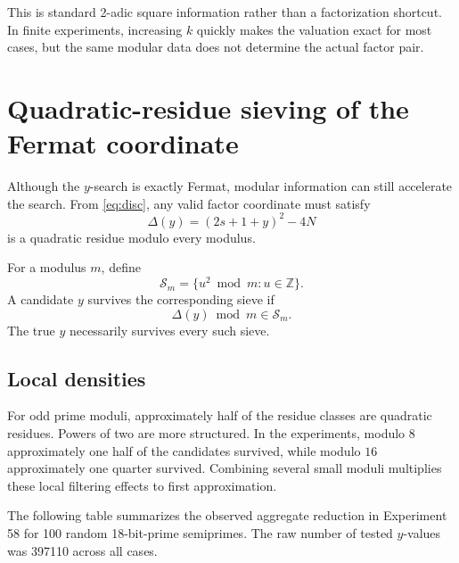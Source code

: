 \documentclass[11pt,a4paper]{article}
\newcommand{\Z}{\mathbb{Z}}
\begin{document}
This is standard 2-adic square information rather than a factorization shortcut. In finite experiments, increasing \(k\) quickly makes the valuation exact for most cases, but the same modular data does not determine the actual factor pair.

\section{Quadratic-residue sieving of the Fermat coordinate}
\label{sec:sieve}

Although the \(y\)-search is exactly Fermat, modular information can still accelerate the search. From \eqref{eq:disc}, any valid factor coordinate must satisfy
\begin{equation}
\Delta(y)=(2s+1+y)^2-4N
\end{equation}
is a quadratic residue modulo every modulus.

For a modulus \(m\), define
\begin{equation}
\mathcal S_m=\{u^2\bmod m:u\in\Z\}.
\end{equation}
A candidate \(y\) survives the corresponding sieve if
\begin{equation}
\Delta(y)\bmod m\in\mathcal S_m.
\end{equation}
The true \(y\) necessarily survives every such sieve.

\subsection{Local densities}

For odd prime moduli, approximately half of the residue classes are quadratic residues. Powers of two are more structured. In the experiments, modulo \(8\) approximately one half of the candidates survived, while modulo \(16\) approximately one quarter survived. Combining several small moduli multiplies these local filtering effects to first approximation.

The following table summarizes the observed aggregate reduction in Experiment 58 for 100 random 18-bit-prime semiprimes. The raw number of tested \(y\)-values was 397110 across all cases.
\end{document}
